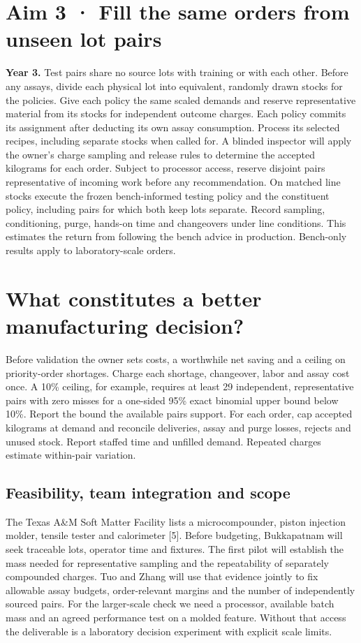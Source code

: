 \documentclass[11pt,letterpaper]{article}
\begin{document}
\section*{Aim 3 · Fill the same orders from unseen lot pairs}

\textbf{Year 3.} Test pairs share no source lots with training or with each other. Before any assays, divide each physical lot into equivalent, randomly drawn stocks for the policies. Give each policy the same scaled demands and reserve representative material from its stocks for independent outcome charges. Each policy commits its assignment after deducting its own assay consumption. Process its selected recipes, including separate stocks when called for. A blinded inspector will apply the owner's charge sampling and release rules to determine the accepted kilograms for each order. Subject to processor access, reserve disjoint pairs representative of incoming work before any recommendation. On matched line stocks execute the frozen bench-informed testing policy and the constituent policy, including pairs for which both keep lots separate. Record sampling, conditioning, purge, hands-on time and changeovers under line conditions. This estimates the return from following the bench advice in production. Bench-only results apply to laboratory-scale orders.

\newpage

\section*{What constitutes a better manufacturing decision?}

Before validation the owner sets costs, a worthwhile net saving and a ceiling on priority-order shortages. Charge each shortage, changeover, labor and assay cost once. A 10\% ceiling, for example, requires at least 29 independent, representative pairs with zero misses for a one-sided 95\% exact binomial upper bound below 10\%. Report the bound the available pairs support. For each order, cap accepted kilograms at demand and reconcile deliveries, assay and purge losses, rejects and unused stock. Report staffed time and unfilled demand. Repeated charges estimate within-pair variation.

\subsection*{Feasibility, team integration and scope}

The Texas A\&M Soft Matter Facility lists a microcompounder, piston injection molder, tensile tester and calorimeter [5]. Before budgeting, Bukkapatnam will seek traceable lots, operator time and fixtures. The first pilot will establish the mass needed for representative sampling and the repeatability of separately compounded charges. Tuo and Zhang will use that evidence jointly to fix allowable assay budgets, order-relevant margins and the number of independently sourced pairs. For the larger-scale check we need a processor, available batch mass and an agreed performance test on a molded feature. Without that access the deliverable is a laboratory decision experiment with explicit scale limits.
\end{document}

